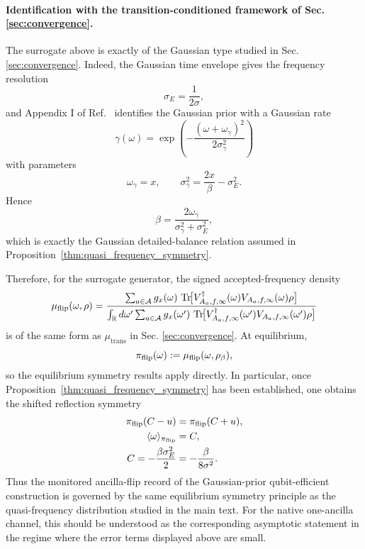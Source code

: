 \documentclass[showpacs,amsmath,amssymb,twocolumn,prx,superscriptaddress,10pt,aps,nofootinbib]{revtex4-2}
\begin{document}
\paragraph{Identification with the transition-conditioned framework of Sec. \ref{sec:convergence}.}
The surrogate above is exactly of the Gaussian type studied in Sec. \ref{sec:convergence}. Indeed, the Gaussian time envelope gives the frequency resolution
\begin{equation}
\sigma_E=\frac{1}{2\sigma},
\end{equation}
and Appendix I of Ref.~\cite{Ding2025} identifies the Gaussian prior with a Gaussian rate
\begin{equation}
\gamma(\omega)
=
\exp\!\left(
-\frac{(\omega+\omega_\gamma)^2}{2\sigma_\gamma^2}
\right)
\end{equation}
with parameters
\begin{equation}
\omega_\gamma=x,
\qquad
\sigma_\gamma^2=\frac{2x}{\beta}-\sigma_E^2.
\end{equation}
Hence
\begin{equation}
\beta=\frac{2\omega_\gamma}{\sigma_\gamma^2+\sigma_E^2},
\end{equation}
which is exactly the Gaussian detailed-balance relation assumed in Proposition~\ref{thm:quasi_frequency_symmetry}.

Therefore, for the surrogate generator, the signed accepted-frequency density
\begin{equation*}
\mu_{\rm flip}(\omega,\rho)
=
\frac{
\sum_{a\in\mathcal A}
g_x(\omega)\,
\Tr\!\bigl[
V_{A_a,f,\infty}^\dagger(\omega)V_{A_a,f,\infty}(\omega)\rho
\bigr]
}{
\int_{\mathbb R} d\omega'
\sum_{a\in\mathcal A}
g_x(\omega')\,
\Tr\!\bigl[
V_{A_a,f,\infty}^\dagger(\omega')V_{A_a,f,\infty}(\omega')\rho
\bigr]
}
\end{equation*}
is of the same form as $\mu_{\mathrm{trans}}$ in Sec. \ref{sec:convergence}. At equilibrium,
\begin{equation*}
\pi_{\rm flip}(\omega):=\mu_{\rm flip}(\omega,\rho_\beta),
\end{equation*}
so the equilibrium symmetry results apply directly. In particular, once Proposition~\ref{thm:quasi_frequency_symmetry} has been established, one obtains the shifted reflection symmetry
\begin{equation}
\begin{aligned}
\pi_{\rm flip}(C-u)&=\pi_{\rm flip}(C+u),
\\
\langle \omega\rangle_{\pi_{\rm flip}}&=C,
\\
C=-\frac{\beta\sigma_E^2}{2}&=-\frac{\beta}{8\sigma^2}.
\end{aligned}
\end{equation}
Thus the monitored ancilla-flip record of the Gaussian-prior qubit-efficient construction is governed by the same equilibrium symmetry principle as the quasi-frequency distribution studied in the main text. For the native one-ancilla channel, this should be understood as the corresponding asymptotic statement in the regime where the error terms displayed above are small.
\end{document}
